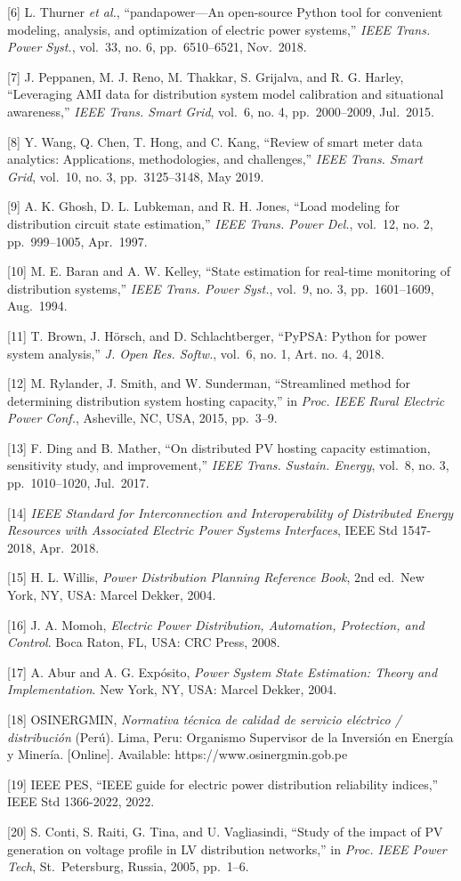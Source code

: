 \documentclass[
  11pt,
]{article}
\begin{document}
{[}6{]} L. Thurner \emph{et al.}, “pandapower—An open-source Python tool
for convenient modeling, analysis, and optimization of electric power
systems,” \emph{IEEE Trans. Power Syst.}, vol.~33, no. 6, pp.~6510–6521,
Nov.~2018.

{[}7{]} J. Peppanen, M. J. Reno, M. Thakkar, S. Grijalva, and R. G.
Harley, “Leveraging AMI data for distribution system model calibration
and situational awareness,” \emph{IEEE Trans. Smart Grid}, vol.~6, no.
4, pp.~2000–2009, Jul.~2015.

{[}8{]} Y. Wang, Q. Chen, T. Hong, and C. Kang, “Review of smart meter
data analytics: Applications, methodologies, and challenges,” \emph{IEEE
Trans. Smart Grid}, vol.~10, no. 3, pp.~3125–3148, May 2019.

{[}9{]} A. K. Ghosh, D. L. Lubkeman, and R. H. Jones, “Load modeling for
distribution circuit state estimation,” \emph{IEEE Trans. Power Del.},
vol.~12, no. 2, pp.~999–1005, Apr.~1997.

{[}10{]} M. E. Baran and A. W. Kelley, “State estimation for real-time
monitoring of distribution systems,” \emph{IEEE Trans. Power Syst.},
vol.~9, no. 3, pp.~1601–1609, Aug.~1994.

{[}11{]} T. Brown, J. Hörsch, and D. Schlachtberger, “PyPSA: Python for
power system analysis,” \emph{J. Open Res. Softw.}, vol.~6, no. 1, Art.
no. 4, 2018.

{[}12{]} M. Rylander, J. Smith, and W. Sunderman, “Streamlined method
for determining distribution system hosting capacity,” in \emph{Proc.
IEEE Rural Electric Power Conf.}, Asheville, NC, USA, 2015, pp.~3–9.

{[}13{]} F. Ding and B. Mather, “On distributed PV hosting capacity
estimation, sensitivity study, and improvement,” \emph{IEEE Trans.
Sustain. Energy}, vol.~8, no. 3, pp.~1010–1020, Jul.~2017.

{[}14{]} \emph{IEEE Standard for Interconnection and Interoperability of
Distributed Energy Resources with Associated Electric Power Systems
Interfaces}, IEEE Std 1547-2018, Apr.~2018.

{[}15{]} H. L. Willis, \emph{Power Distribution Planning Reference
Book}, 2nd ed.~New York, NY, USA: Marcel Dekker, 2004.

{[}16{]} J. A. Momoh, \emph{Electric Power Distribution, Automation,
Protection, and Control}. Boca Raton, FL, USA: CRC Press, 2008.

{[}17{]} A. Abur and A. G. Expósito, \emph{Power System State
Estimation: Theory and Implementation}. New York, NY, USA: Marcel
Dekker, 2004.

{[}18{]} OSINERGMIN, \emph{Normativa técnica de calidad de servicio
eléctrico / distribución} (Perú). Lima, Peru: Organismo Supervisor de la
Inversión en Energía y Minería. {[}Online{]}. Available:
https://www.osinergmin.gob.pe

{[}19{]} IEEE PES, “IEEE guide for electric power distribution
reliability indices,” IEEE Std 1366-2022, 2022.

{[}20{]} S. Conti, S. Raiti, G. Tina, and U. Vagliasindi, “Study of the
impact of PV generation on voltage profile in LV distribution networks,”
in \emph{Proc. IEEE Power Tech}, St.~Petersburg, Russia, 2005, pp.~1–6.
\end{document}
